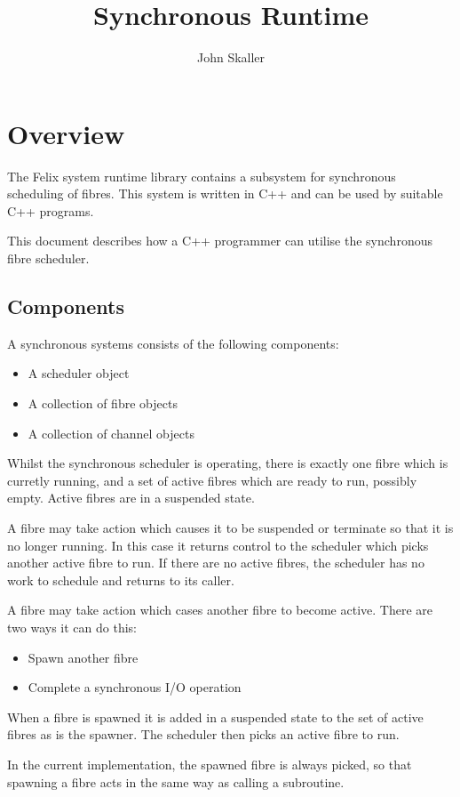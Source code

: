 \documentclass[oneside]{book}
\title{Synchronous Runtime}
\author{John Skaller}
\begin{document}
\maketitle
\tableofcontents
\chapter{Overview}
The Felix system runtime library contains a subsystem for synchronous scheduling of fibres.
This system is written in C++ and can be used by suitable C++ programs.

This document describes how a C++ programmer can utilise the synchronous fibre scheduler.

\section{Components}
A synchronous systems consists of the following components:

\begin{itemize}
\item A scheduler object
\item A collection of fibre objects
\item A collection of channel objects
\end{itemize}

Whilst the synchronous scheduler is operating, there is exactly one
fibre which is curretly running, and a set of active fibres which are ready to
run, possibly empty. Active fibres are in a suspended state.

A fibre may take action which causes it to be suspended or terminate 
so that it is no longer running. In this case it returns control to the scheduler which
picks another active fibre to run. If there are no active fibres, the scheduler
has no work to schedule and returns to its caller.

A fibre may take action which cases another fibre to become active.
There are two ways it can do this:

\begin{itemize}
\item Spawn another fibre
\item Complete a synchronous I/O operation
\end{itemize}

When a fibre is spawned it is added in a suspended state to the set of
active fibres as is the spawner. The scheduler then picks an active
fibre to run. 

In the current implementation, the spawned fibre is always picked,
so that spawning a fibre acts in the same way as calling a subroutine.
\end{document}
